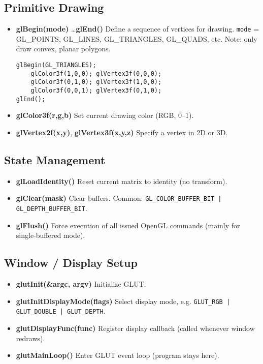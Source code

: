\documentclass[10pt,twocolumn]{extarticle}
\begin{document}
\subsection*{Primitive Drawing}
\begin{itemize}
  \item \textbf{glBegin(mode)} \dots \textbf{glEnd()}  
  Define a sequence of vertices for drawing.  
  \texttt{mode} = GL\_POINTS, GL\_LINES, GL\_TRIANGLES, GL\_QUADS, etc. Note: only draw convex, planar polygons.
    \begin{lstlisting}
glBegin(GL_TRIANGLES);
    glColor3f(1,0,0); glVertex3f(0,0,0);
    glColor3f(0,1,0); glVertex3f(1,0,0);
    glColor3f(0,0,1); glVertex3f(0,1,0);
glEnd();\end{lstlisting}
  \item \textbf{glColor3f(r,g,b)}  
  Set current drawing color (RGB, 0–1).

  \item \textbf{glVertex2f(x,y)}, \textbf{glVertex3f(x,y,z)}  
  Specify a vertex in 2D or 3D.
\end{itemize}

\subsection*{State Management}
\begin{itemize}
  \item \textbf{glLoadIdentity()}  
  Reset current matrix to identity (no transform).

  \item \textbf{glClear(mask)}  
  Clear buffers. Common: \texttt{GL\_COLOR\_BUFFER\_BIT | GL\_DEPTH\_BUFFER\_BIT}.

  \item \textbf{glFlush()}  
  Force execution of all issued OpenGL commands (mainly for single-buffered mode).
\end{itemize}

\subsection*{Window / Display Setup}
\begin{itemize}
  \item \textbf{glutInit(\&argc, argv)}  
  Initialize GLUT.

  \item \textbf{glutInitDisplayMode(flags)}  
  Select display mode, e.g. \texttt{GLUT\_RGB | GLUT\_DOUBLE | GLUT\_DEPTH}.

  \item \textbf{glutDisplayFunc(func)}  
  Register display callback (called whenever window redraws).

  \item \textbf{glutMainLoop()}  
  Enter GLUT event loop (program stays here).
\end{itemize}
\end{document}
